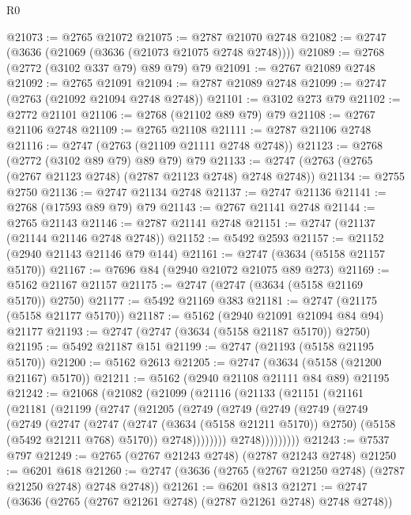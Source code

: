 \begin{lexlean}{R0}
\begin{coremodule}
@21073 := @2765 @21072
@21075 := @2787 @21070 @2748
@21082 := @2747 (@3636 (@21069 (@3636 (@21073 @21075 @2748 @2748))))
@21089 := @2768 (@2772 (@3102 @337 @79) @89 @79) @79
@21091 := @2767 @21089 @2748
@21092 := @2765 @21091
@21094 := @2787 @21089 @2748
@21099 := @2747 (@2763 (@21092 @21094 @2748 @2748))
@21101 := @3102 @273 @79
@21102 := @2772 @21101
@21106 := @2768 (@21102 @89 @79) @79
@21108 := @2767 @21106 @2748
@21109 := @2765 @21108
@21111 := @2787 @21106 @2748
@21116 := @2747 (@2763 (@21109 @21111 @2748 @2748))
@21123 := @2768 (@2772 (@3102 @89 @79) @89 @79) @79
@21133 := @2747 (@2763 (@2765 (@2767 @21123 @2748) (@2787 @21123 @2748) @2748 @2748))
@21134 := @2755 @2750
@21136 := @2747 @21134 @2748
@21137 := @2747 @21136
@21141 := @2768 (@17593 @89 @79) @79
@21143 := @2767 @21141 @2748
@21144 := @2765 @21143
@21146 := @2787 @21141 @2748
@21151 := @2747 (@21137 (@21144 @21146 @2748 @2748))
@21152 := @5492 @2593
@21157 := @21152 (@2940 @21143 @21146 @79 @144)
@21161 := @2747 (@3634 (@5158 @21157 @5170))
@21167 := @7696 @84 (@2940 @21072 @21075 @89 @273)
@21169 := @5162 @21167 @21157
@21175 := @2747 (@2747 (@3634 (@5158 @21169 @5170)) @2750)
@21177 := @5492 @21169 @383
@21181 := @2747 (@21175 (@5158 @21177 @5170))
@21187 := @5162 (@2940 @21091 @21094 @84 @94) @21177
@21193 := @2747 (@2747 (@3634 (@5158 @21187 @5170)) @2750)
@21195 := @5492 @21187 @151
@21199 := @2747 (@21193 (@5158 @21195 @5170))
@21200 := @5162 @2613
@21205 := @2747 (@3634 (@5158 (@21200 @21167) @5170))
@21211 := @5162 (@2940 @21108 @21111 @84 @89) @21195
@21242 := @21068
    (@21082
      (@21099
        (@21116
          (@21133
            (@21151
              (@21161
                (@21181
                  (@21199
                    (@2747
                      (@21205
                        (@2749
                          (@2749
                            (@2749
                              (@2749
                                (@2749
                                  (@2749
                                    (@2747
                                      (@2747
                                        (@2747 (@3634 (@5158 @21211 @5170)) @2750)
                                        (@5158 (@5492 @21211 @768) @5170))
                                      @2748))))))))
                      @2748)))))))))
@21243 := @7537 @797
@21249 := @2765 (@2767 @21243 @2748) (@2787 @21243 @2748)
@21250 := @6201 @618
@21260 := @2747 (@3636 (@2765 (@2767 @21250 @2748) (@2787 @21250 @2748) @2748 @2748))
@21261 := @6201 @813
@21271 := @2747 (@3636 (@2765 (@2767 @21261 @2748) (@2787 @21261 @2748) @2748 @2748))

\end{coremodule}
\end{lexlean}
